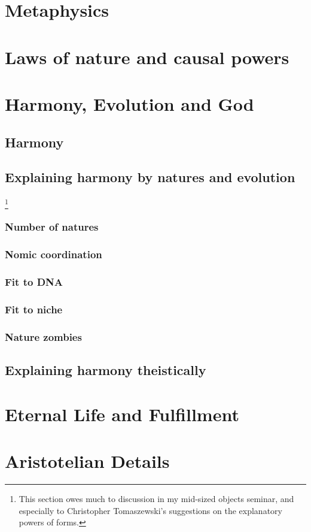 \def\mychapter{VI}

\chapter{Metaphysics}\label{ch:metaphysics}
\chaptertail 

\def\mychapter{VII}

\chapter{Laws of nature and causal powers}\label{ch:laws}
\chaptertail

\def\mychapter{VIII}

\chapter{Harmony, Evolution and God}\label{ch:God}
\section{Harmony}
\section{Explaining harmony by natures and evolution}
\footnote{This section owes much to discussion in my mid-sized objects seminar, and especially to Christopher Tomaszewski's suggestions on the explanatory powers of forms.}
\subsection{Number of natures}
\subsection{Nomic coordination}
\subsection{Fit to DNA}
\subsection{Fit to niche}
\subsection{Nature zombies}
\section{Explaining harmony theistically}
\chaptertail

\def\mychapter{IX}

\chapter{Eternal Life and Fulfillment}\label{ch:eternal-life}
\chaptertail

\def\mychapter{X}

\chapter{Aristotelian Details}\label{ch:details}
\chaptertail
